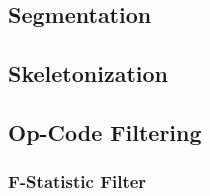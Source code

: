 \documentclass[../main.tex]{subfiles}
\begin{document}
\subsection{Segmentation}

\subsection{Skeletonization}

\subsection{Op-Code Filtering}
\subsubsection{F-Statistic Filter}
\end{document}
